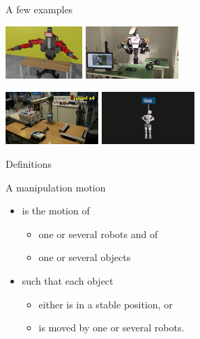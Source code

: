 %
%

\begin {frame} {A few examples}
  \begin {center}
    \includegraphics [height=2cm] {figures/baxter-manipulation.png}
    \hspace*{.7cm}
    \includegraphics [height=2cm] {figures/nextage-demo.png}
  \end {center}
  \begin {center}
    \includegraphics [height=2cm] {figures/fiad-full-run.png}
    \hspace*{.2cm}
    \includegraphics [height=2cm] {figures/romeo-placard.png}
  \end {center}
\end {frame}

%
%

\begin {frame} {Definitions}

A manipulation motion
\begin {itemize}
\item  is the motion of
  \begin {itemize}
  \item one or several robots and of
  \item one or several objects
  \end {itemize}
\pause
\item such that each object
  \begin{itemize}
  \item either is in a stable position, or
  \item is moved by one or several robots.
  \end {itemize}
\end {itemize}
\end {frame}

